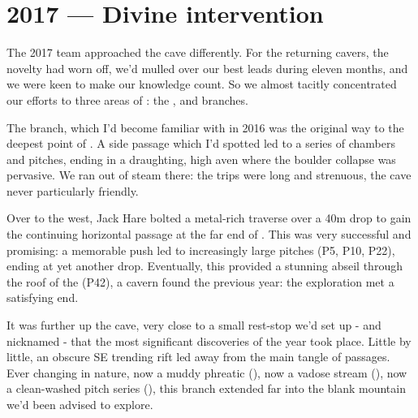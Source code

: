 \section{2017 --- Divine intervention}
The 2017 team approached the cave differently. For the returning cavers, the novelty had worn off, we'd mulled over our best leads during eleven months, and we were keen to make our knowledge count. So we almost tacitly concentrated our efforts to three areas of : the ,  and  branches.

The  branch, which I'd become familiar with in 2016 was the original way to the deepest point of . A side passage which I'd spotted led to a series of chambers and pitches, ending in a draughting, high aven where the boulder collapse was pervasive. We ran out of steam there: the trips were long and strenuous, the cave never particularly friendly.

Over to the west, Jack Hare bolted a metal-rich traverse over a 40m drop to gain the continuing horizontal passage at the far end of . This was very successful and promising: a memorable push led to increasingly large pitches (P5, P10, P22), ending at yet another drop. Eventually, this provided a stunning abseil through the roof of the  (P42), a cavern found the previous year: the exploration met a satisfying end.

It was further up the cave, very close to a small rest-stop we'd set up - and nicknamed - that the most significant discoveries of the year took place. Little by little, an obscure SE trending rift led away from the main tangle of passages. Ever changing in nature, now a muddy phreatic (), now a vadose stream (), now a clean-washed pitch series (), this branch extended far into the blank mountain we'd been advised to explore.  

